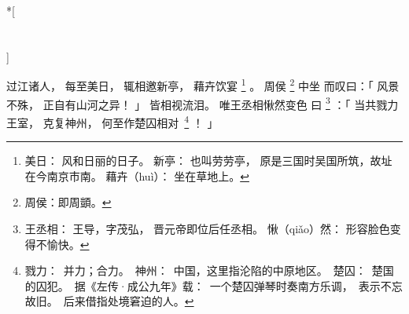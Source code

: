 
\switchcolumn[0]*[\section{}]

过江诸人，
每至美日，
辄相邀新亭，
藉卉饮宴%
\footnote{%
    美日：
        风和日丽的日子。
    新亭：
        也叫劳劳亭，
        原是三国时吴国所筑，故址在今南京市南。
    藉卉（huì）：
        坐在草地上。
}%
。
周侯%
\footnote{%
    周侯：即周顗。
}%
中坐
而叹曰：「
    风景不殊，
    正自有山河之异！
」
皆相视流泪。
唯王丞相愀然变色
曰%
\footnote{%
    王丞相：
        王导，字茂弘，
        晋元帝即位后任丞相。
    愀（qiǎo）然：
        形容脸色变得不愉快。
}%
：「
    当共戮力王室，
    克复神州，
    何至作楚囚相\mbox{对%
    \footnote{%
        戮力：
            并力；合力。
        神州：
            中国，这里指沦陷的中原地区。
        楚囚：
            楚国的囚犯。
            据《左传·成公九年》载：
            一个楚囚弹琴时奏南方乐调，
            表示不忘故旧。
            后来借指处境窘迫的人。
    }}%
    ！
」

\switchcolumn


